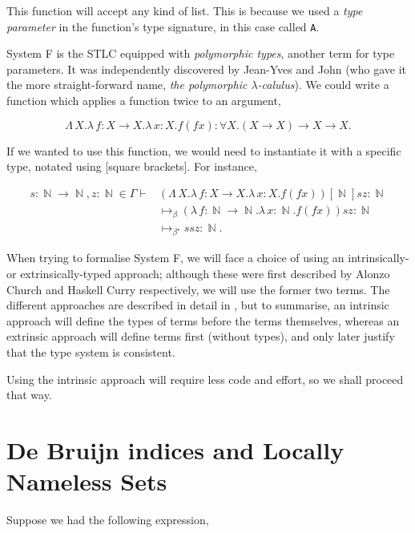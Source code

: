 \documentclass[logo,bsc,singlespacing,parskip,online]{infthesis}
\DeclareMathOperator{\nat}{\mathbb{N}}
\begin{document}
This function will accept any kind of list. This is because we used a
\textit{type parameter} in the function's type signature, in this case called
\texttt{A}.

System F is the STLC equipped with \textit{polymorphic types}, another term for
type parameters. It was independently discovered by Jean-Yves
\citet{girard_interpretation_1972} and John \citet{goos_towards_1974} (who gave
it the more straight-forward name, \textit{the polymorphic $\lambda$-calulus}).
We could write a function which applies a function twice to an argument,

\begin{equation*}
  \Lambda \, X. \lambda \, f \colon X \to X . \lambda \, x \colon X . f (f x) \colon \forall X . (X \to X) \to X \to X.
\end{equation*}

If we wanted to use this function, we would need to instantiate it with a
specific type, notated using [square brackets]. For instance,

\begin{align*}
  s \colon \nat \to \nat, z \colon \nat \in \Gamma \vdash &(\Lambda \, X. \lambda \, f \colon X \to X . \lambda \, x \colon X . f (f x))[\nat] s z \colon \nat\\
  &\mapsto_{\beta} (\lambda \, f \colon \nat \to \nat . \lambda \, x \colon \nat . f (f x)) s z \colon \nat\\
  &\mapsto_{\beta^{\star}} s s z \colon \nat.
\end{align*}

When trying to formalise System F, we will face a choice of using an
intrinsically- or extrinsically-typed approach; although these were first
described by Alonzo Church and Haskell Curry respectively, we will use the
former two terms. The different approaches are described in detail in
\citet{gries_what_2003}, but to summarise, an intrinsic approach will define the
types of terms before the terms themselves, whereas an extrinsic approach will
define terms first (without types), and only later justify that the type system
is consistent.

Using the intrinsic approach will require less code and effort, so we shall
proceed that way.

\section{De Bruijn indices and Locally Nameless Sets}

Suppose we had the following expression,
\end{document}
